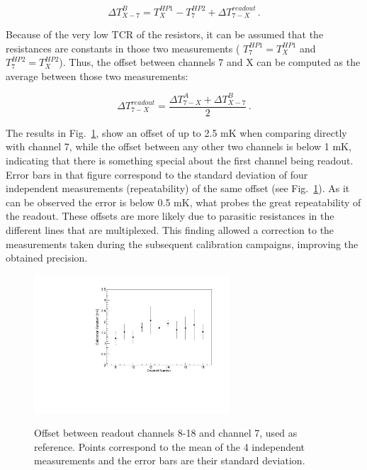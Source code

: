     \begin{equation}
        \Delta T_{X-7}^B = T_{X}^{HP1}-T_{7}^{HP2}+\Delta T_{7-X}^{readout} \, .
    \end{equation}  

\noindent 
Because of the very low TCR of the resistors, it can be assumed that the resistances are constants in those two measurements ( $T_{7}^{HP1}=T_{X}^{HP1}$ and $T_{7}^{HP2}=T_{X}^{HP2}$). Thus, the offset between channels 7 and X can be computed as the average between those two measurements: 

\begin{equation}
    \Delta T_{7-X}^{readout} = \frac{\Delta T^{A}_{7-X} + \Delta T^{B}_{X-7}}{2} \, .
\end{equation}

The results in Fig.~\ref{fig:readout_calib}, show an offset of up to 2.5 mK when comparing directly with channel 7, while the offset between any other two channels is below 1 mK, indicating that there is something special about the first channel being readout. Error bars in that figure correspond to the standard deviation of four independent measurements (repeatability) of the same offset (see Fig.~\ref{fig:readout_calib}). As it can be observed the error is below 0.5 mK, what probes the great repeatability of the readout. These offsets are more likely due to parasitic resistances in the different lines that are multiplexed. This finding allowed a correction to the measurements taken during the subsequent calibration campaigns, improving the obtained precision. 

\begin{figure}[htbp]
\centering
{\includegraphics[width=0.65\textwidth]{images/figure_3.pdf}}
\caption{Offset between readout channels 8-18 and channel 7, used as reference. Points correspond to the mean of the 4 independent measurements and the error bars are their standard deviation.}
\label{fig:readout_calib}
\end{figure}